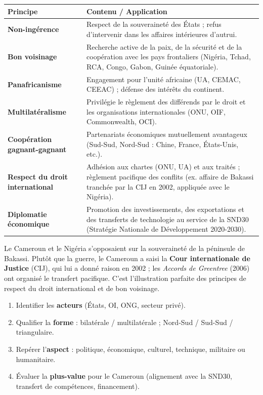 \documentclass[11pt]{article}
\newcommand{\cle}[1]{{\popxbold\color{popdark}#1}}
\newcounter{popsec}
\newcounter{popsub}
\newcommand{\courssub}[1]{%
  \stepcounter{popsub}%
  \par\vspace{9pt}\noindent{\popxbold\fontsize{11.5}{13}\selectfont\color{popink}{\color{poporange}\thepopsec.\thepopsub}\hspace{6pt}#1}\par\nopagebreak\vspace{4pt}
}
\begin{document}
\begin{center}
\begin{tabularx}{\linewidth}{|>{\bfseries}l|X|}\hline
\rowcolor{popblueL}\textbf{Principe} & \textbf{Contenu / Application} \\\hline
Non-ingérence & Respect de la souveraineté des États ; refus d'intervenir dans les affaires intérieures d'autrui.\\\hline
Bon voisinage & Recherche active de la paix, de la sécurité et de la coopération avec les pays frontaliers (Nigéria, Tchad, RCA, Congo, Gabon, Guinée équatoriale).\\\hline
Panafricanisme & Engagement pour l'unité africaine (UA, CEMAC, CEEAC) ; défense des intérêts du continent.\\\hline
Multilatéralisme & Privilégie le règlement des différends par le droit et les organisations internationales (ONU, OIF, Commonwealth, OCI).\\\hline
Coopération gagnant-gagnant & Partenariats économiques mutuellement avantageux (Sud-Sud, Nord-Sud : Chine, France, États-Unis, etc.).\\\hline
Respect du droit international & Adhésion aux chartes (ONU, UA) et aux traités ; règlement pacifique des conflits (ex. affaire de Bakassi tranchée par la CIJ en 2002, appliquée avec le Nigéria).\\\hline
Diplomatie économique & Promotion des investissements, des exportations et des transferts de technologie au service de la SND30 (Stratégie Nationale de Développement 2020-2030).\\\hline
\end{tabularx}
\end{center}

\begin{exemplebox}
Le Cameroun et le Nigéria s'opposaient sur la souveraineté de la péninsule de Bakassi. Plutôt que la guerre, le Cameroun a saisi la \textbf{Cour internationale de Justice} (CIJ), qui lui a donné raison en 2002 ; les \emph{Accords de Greentree} (2006) ont organisé le transfert pacifique. C'est l'illustration parfaite des principes de \cle{respect du droit international} et de \cle{bon voisinage}.
\end{exemplebox}

\courssub{Méthodes express}

\begin{methode}
  \begin{enumerate}
    \item Identifier les \textbf{acteurs} (États, OI, ONG, secteur privé).
    \item Qualifier la \textbf{forme} : bilatérale / multilatérale ; Nord-Sud / Sud-Sud / triangulaire.
    \item Repérer l'\textbf{aspect} : politique, économique, culturel, technique, militaire ou humanitaire.
    \item Évaluer la \textbf{plus-value} pour le Cameroun (alignement avec la SND30, transfert de compétences, financement).
  \end{enumerate}
\end{methode}
\end{document}
